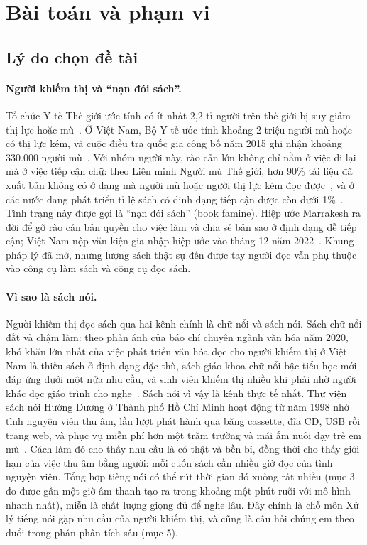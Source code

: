 \documentclass[12pt,a4paper]{article}
\begin{document}
\section{Bài toán và phạm vi}

\subsection{Lý do chọn đề tài}

\paragraph{Người khiếm thị và ``nạn đói sách''.} Tổ chức Y tế Thế giới ước tính có ít nhất 2,2 tỉ người trên thế giới bị suy giảm thị lực hoặc mù~\cite{b10}. Ở Việt Nam, Bộ Y tế ước tính khoảng 2 triệu người mù hoặc có thị lực kém, và cuộc điều tra quốc gia công bố năm 2015 ghi nhận khoảng 330.000 người mù~\cite{b11}. Với nhóm người này, rào cản lớn không chỉ nằm ở việc đi lại mà ở việc tiếp cận chữ: theo Liên minh Người mù Thế giới, hơn 90\% tài liệu đã xuất bản không có ở dạng mà người mù hoặc người thị lực kém đọc được~\cite{b12}, và ở các nước đang phát triển tỉ lệ sách có định dạng tiếp cận được còn dưới 1\%~\cite{b13}. Tình trạng này được gọi là ``nạn đói sách'' (book famine). Hiệp ước Marrakesh ra đời để gỡ rào cản bản quyền cho việc làm và chia sẻ bản sao ở định dạng dễ tiếp cận; Việt Nam nộp văn kiện gia nhập hiệp ước vào tháng 12 năm 2022~\cite{b14}. Khung pháp lý đã mở, nhưng lượng sách thật sự đến được tay người đọc vẫn phụ thuộc vào công cụ làm sách và công cụ đọc sách.

\paragraph{Vì sao là sách nói.} Người khiếm thị đọc sách qua hai kênh chính là chữ nổi và sách nói. Sách chữ nổi đắt và chậm làm: theo phản ánh của báo chí chuyên ngành văn hóa năm 2020, khó khăn lớn nhất của việc phát triển văn hóa đọc cho người khiếm thị ở Việt Nam là thiếu sách ở định dạng đặc thù, sách giáo khoa chữ nổi bậc tiểu học mới đáp ứng dưới một nửa nhu cầu, và sinh viên khiếm thị nhiều khi phải nhờ người khác đọc giáo trình cho nghe~\cite{b15}. Sách nói vì vậy là kênh thực tế nhất. Thư viện sách nói Hướng Dương ở Thành phố Hồ Chí Minh hoạt động từ năm 1998 nhờ tình nguyện viên thu âm, lần lượt phát hành qua băng cassette, đĩa CD, USB rồi trang web, và phục vụ miễn phí hơn một trăm trường và mái ấm nuôi dạy trẻ em mù~\cite{b16}. Cách làm đó cho thấy nhu cầu là có thật và bền bỉ, đồng thời cho thấy giới hạn của việc thu âm bằng người: mỗi cuốn sách cần nhiều giờ đọc của tình nguyện viên. Tổng hợp tiếng nói có thể rút thời gian đó xuống rất nhiều (mục 3 đo được gần một giờ âm thanh tạo ra trong khoảng một phút rưỡi với mô hình nhanh nhất), miễn là chất lượng giọng đủ để nghe lâu. Đây chính là chỗ môn Xử lý tiếng nói gặp nhu cầu của người khiếm thị, và cũng là câu hỏi chúng em theo đuổi trong phần phân tích sâu (mục 5).
\end{document}
